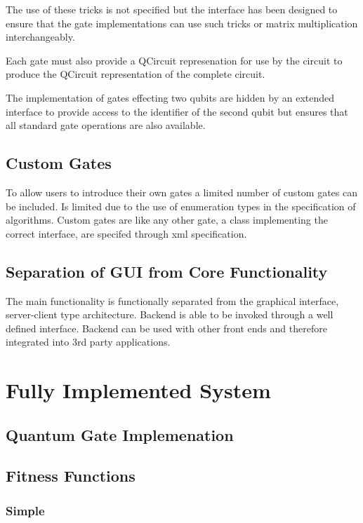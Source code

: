 \documentclass[authoryearcitations]{UoYCSproject}
\begin{document}
The use of these tricks is not specified but the interface has been designed to ensure that the gate implementations can use such tricks or matrix multiplication interchangeably.

Each gate must also provide a QCircuit represenation for use by the circuit to produce the QCircuit representation of the complete circuit.

The implementation of gates effecting two qubits are hidden by an extended interface to provide access to the identifier of the second qubit but ensures that all standard gate operations are also available.

\subsection{Custom Gates}


To allow users to introduce their own gates a limited number of custom gates can be included.
Is limited due to the use of enumeration types in the specification of algorithms.
Custom gates are like any other gate, a class implementing the correct interface, are specifed through xml specification.

\subsection{Separation of GUI from Core Functionality}
The main functionality is functionally separated from the graphical interface, server-client type architecture.
Backend is able to be invoked through a well defined interface.
Backend can be used with other front ends and therefore integrated into 3rd party applications.

\section{Fully Implemented System}
\subsection{Quantum Gate Implemenation}


\subsection{Fitness Functions}

\subsubsection{Simple}
\end{document}
